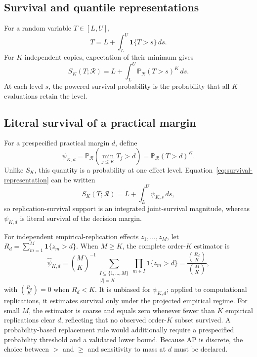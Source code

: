 \documentclass[11pt]{article}
\newcommand{\Regime}{\mathcal{R}}
\newcommand{\Prb}{\mathbb{P}}
\theoremstyle{remark}
\begin{document}
\subsection{Survival and quantile representations}

For a random variable $T\in[L,U]$,
\[
T=L+\int_L^U\mathbf 1\{T>s\}\,ds.
\]
For $K$ independent copies, expectation of their minimum gives
\begin{equation}
S_K(T;\Regime)
=
L+\int_L^U\Prb_{\Regime}(T>s)^K\,ds.
\label{eq:survival-representation}
\end{equation}
At each level $s$, the powered survival probability is the probability that all $K$ evaluations retain the level.

\subsection{Literal survival of a practical margin}
\label{app:literal-survival}

For a prespecified practical margin $d$, define
\begin{equation}
\psi_{K,d}
=
\Prb_{\Regime}\left(\min_{j\leq K}T_j>d\right)
=
\Prb_{\Regime}(T>d)^K.
\label{eq:literal-survival}
\end{equation}
Unlike $S_K$, this quantity is a probability at one effect level. Equation~\eqref{eq:survival-representation} can be written
\[
S_K(T;\Regime)=L+\int_L^U\psi_{K,s}\,ds,
\]
so replication-survival support is an integrated joint-survival magnitude, whereas $\psi_{K,d}$ is literal survival of the decision margin.

For independent empirical-replication effects $z_1,\ldots,z_M$, let $R_d=\sum_{m=1}^M\mathbf 1\{z_m>d\}$. When $M\geq K$, the complete order-$K$ estimator is
\begin{equation}
\widehat\psi_{K,d}
=
\binom MK^{-1}
\sum_{\substack{I\subseteq\{1,\ldots,M\}\\|I|=K}}
\prod_{m\in I}\mathbf 1\{z_m>d\}
=
\frac{\binom{R_d}{K}}{\binom MK},
\label{eq:literal-survival-estimator}
\end{equation}
with $\binom{R_d}{K}=0$ when $R_d<K$. It is unbiased for $\psi_{K,d}$; applied to computational replications, it estimates survival only under the projected empirical regime. For small $M$, the estimator is coarse and equals zero whenever fewer than $K$ empirical replications clear $d$, reflecting that no observed order-$K$ subset survived. A probability-based replacement rule would additionally require a prespecified probability threshold and a validated lower bound. Because AP is discrete, the choice between $>$ and $\geq$ and sensitivity to mass at $d$ must be declared.
\end{document}
